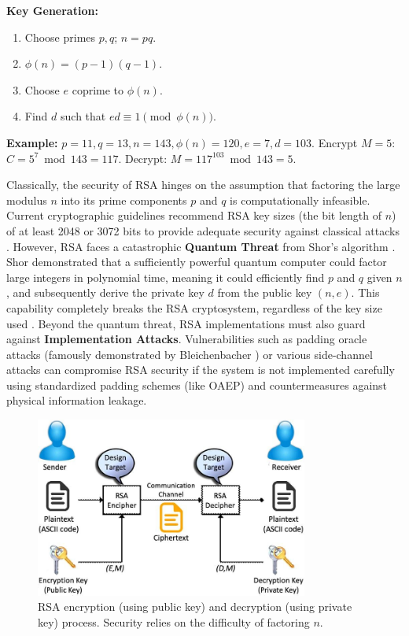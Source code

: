 \textbf{Key Generation:}
\begin{enumerate}
    \item Choose primes $p, q$; $n = pq$.
    \item $\phi(n) = (p-1)(q-1)$.
    \item Choose $e$ coprime to $\phi(n)$.
    \item Find $d$ such that $ed \equiv 1 \pmod{\phi(n)}$.
\end{enumerate}
\textbf{Example:} $p=11, q=13, n=143, \phi(n)=120, e=7, d=103$. Encrypt $M=5$: $C=5^7 \bmod 143=117$. Decrypt: $M=117^{103} \bmod 143=5$.

Classically, the security of RSA hinges on the assumption that factoring the large modulus $n$ into its prime components $p$ and $q$ is computationally infeasible. Current cryptographic guidelines recommend RSA key sizes (the bit length of $n$) of at least 2048 or 3072 bits to provide adequate security against classical attacks \parencite{nist_sp800_57p1r5}. However, RSA faces a catastrophic \textbf{Quantum Threat} from Shor's algorithm \parencite{shor1994algorithms}. Shor demonstrated that a sufficiently powerful quantum computer could factor large integers in polynomial time, meaning it could efficiently find $p$ and $q$ given $n$, and subsequently derive the private key $d$ from the public key $(n, e)$. This capability completely breaks the RSA cryptosystem, regardless of the key size used \parencite{bernstein2017post}. Beyond the quantum threat, RSA implementations must also guard against \textbf{Implementation Attacks}. Vulnerabilities such as padding oracle attacks (famously demonstrated by Bleichenbacher \parencite{bleichenbacher1998chosen}) or various side-channel attacks can compromise RSA security if the system is not implemented carefully using standardized padding schemes (like OAEP) and countermeasures against physical information leakage.

\begin{figure}[h]
    \centering
    \includegraphics[width=0.8\textwidth]{03_Classical_Cryptography/rsa_encryption}
    \caption{RSA encryption (using public key) and decryption (using private key) process. Security relies on the difficulty of factoring $n$.}
    \label{fig:rsa_encryption_ch3}
\end{figure}

